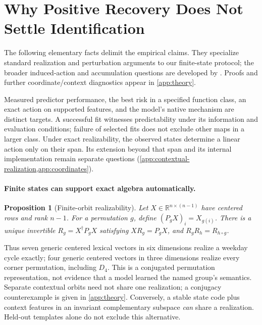 \documentclass{article}
\newcommand{\R}{\mathbb{R}}
\newtheorem{proposition}{Proposition}
\begin{document}
\section{Why Positive Recovery Does Not Settle Identification}
\label{sec:boundaries}
The following elementary facts delimit the empirical claims. They specialize standard realization and perturbation arguments to our finite-state protocol; the broader induced-action and accumulation questions are developed by \citet{sun2026transformationlaws}. Proofs and further coordinate/context diagnostics appear in \cref{app:theory}.

Measured predictor performance, the best risk in a specified function class, an exact action on supported features, and the model's native mechanism are distinct targets. A successful fit witnesses predictability under its information and evaluation conditions; failure of selected fits does not exclude other maps in a larger class. Under exact realizability, the observed states determine a linear action only on their span. Its extension beyond that span and its internal implementation remain separate questions (\cref{app:contextual-realization,app:coordinates}).

\paragraph{Finite states can support exact algebra automatically.}
\begin{proposition}[Finite-orbit realizability]
\label{prop:finite}
Let $X\in\R^{n\times(n-1)}$ have centered rows and rank $n-1$. For a permutation $g$, define $(P_gX)_i=X_{g(i)}$. There is a unique invertible $R_g=X^\dagger P_gX$ satisfying $XR_g=P_gX$, and $R_gR_h=R_{h\circ g}$.
\end{proposition}
Thus seven generic centered lexical vectors in six dimensions realize a weekday cycle exactly; four generic centered vectors in three dimensions realize every corner permutation, including $D_4$. This is a conjugated permutation representation, not evidence that a model learned the named group's semantics. Separate contextual orbits need not share one realization; a conjugacy counterexample is given in \cref{app:theory}. Conversely, a stable state code plus context features in an invariant complementary subspace \emph{can} share a realization. Held-out templates alone do not exclude this alternative.
\end{document}
